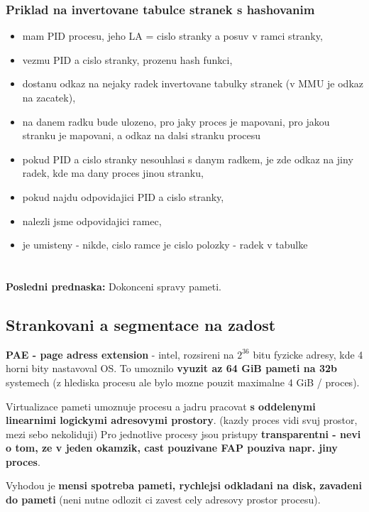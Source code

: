 \documentclass[a4paper, 11pt]{article}
\begin{document}
\subsubsection{Priklad na invertovane tabulce stranek s hashovanim}
\begin{itemize}
    \item mam PID procesu, jeho LA = cislo stranky a posuv v ramci stranky,
    \item vezmu PID a cislo stranky, prozenu hash funkci,
    \item dostanu odkaz na nejaky radek invertovane tabulky stranek (v MMU je odkaz na zacatek),
    \item na danem radku bude ulozeno, pro jaky proces je mapovani, pro jakou stranku je mapovani, a odkaz na dalsi stranku procesu
    \item pokud PID a cislo stranky nesouhlasi s danym radkem, je zde odkaz na jiny radek, kde ma dany proces jinou stranku,
    \item pokud najdu odpovidajici PID a cislo stranky,
    \item nalezli jsme odpovidajici ramec,
    \item je umisteny - nikde, cislo ramce je cislo polozky - radek v tabulke \\
\end{itemize}

\newpage

\section{}
\textbf{Posledni prednaska:} Dokonceni spravy pameti.
\subsection{Strankovani a segmentace na zadost}
\textbf{PAE - page adress extension} - intel, rozsireni na $2^36$ bitu fyzicke adresy, kde 4 horni bity nastavoval OS. To umoznilo \textbf{vyuzit az 64 GiB pameti na 32b} systemech (z hlediska procesu ale bylo mozne pouzit maximalne 4 GiB / proces).

Virtualizace pameti umoznuje procesu a jadru pracovat \textbf{s oddelenymi linearnimi logickymi adresovymi prostory}. (kazdy proces vidi svuj prostor, mezi sebo nekoliduji) Pro jednotlive procesy jsou pristupy \textbf{transparentni - nevi o tom, ze v jeden okamzik, cast pouzivane FAP pouziva napr. jiny proces}.

Vyhodou je \textbf{mensi spotreba pameti, rychlejsi odkladani na disk, zavadeni do pameti} (neni nutne odlozit ci zavest cely adresovy prostor procesu).
\end{document}
